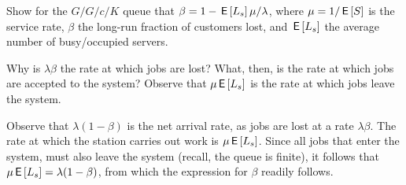\begin{exercise}\label{ex:l-185}
  Show for the $G/G/c/K$ queue that $\beta = 1 - \,\mathsf{E}\left[L_s\right]\mu/ \lambda$, where $\mu=1/\,\mathsf{E}\left[S\right]$ is the service rate, $\beta$ the long-run fraction of customers lost, and $\,\mathsf{E}\left[L_s\right]$ the average number of busy/occupied servers.
\begin{hint}
  Why is $\lambda \beta$ the rate at which jobs are lost?
  What, then, is the rate at which jobs are accepted to the system?
  Observe that  $\mu \,\mathsf{E}\left[L_s\right]$ is the rate at which jobs leave the system.
\end{hint}

\begin{solution}
  Observe that $\lambda(1-\beta)$ is the net arrival rate, as jobs are lost at a rate $\lambda\beta$.
  The rate at which the station carries out work is $\mu \,\mathsf{E}\left[L_s\right]$.
  Since all jobs that enter the system, must also leave the system (recall, the queue is finite), it follows that $\mu \,\mathsf{E}\left[L_s\right] = \lambda(1-\beta)$, from which the expression for $\beta$ readily follows.



\end{solution}
\end{exercise}



